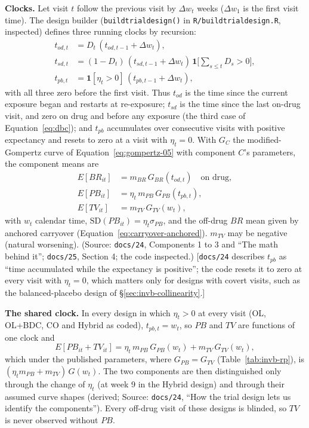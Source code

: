 \documentclass[11pt]{article}
\newcommand{\note}[1]{\textcolor{blue!60!black}{\small [#1]}}
\newcommand{\code}[1]{\texttt{#1}}
\begin{document}
\textbf{Clocks.} Let visit $t$ follow the previous visit by
$\Delta w_t$ weeks ($\Delta w_1$ is the first visit time). The design
builder (\code{buildtrialdesign()} in \code{R/buildtrialdesign.R},
inspected) defines three running clocks by recursion:
\begin{equation}
\begin{aligned}
t_{od,t} &= D_t\,(t_{od,t-1} + \Delta w_t), \\
t_{sd,t} &= (1 - D_t)\,(t_{sd,t-1} + \Delta w_t)\,
  \mathbf 1\Big[\textstyle\sum_{s \le t} D_s > 0\Big], \\
t_{pb,t} &= \mathbf 1[\eta_t > 0]\,(t_{pb,t-1} + \Delta w_t),
\end{aligned}
\label{eq:invb-clocks}
\end{equation}
with all three zero before the first visit. Thus $t_{od}$ is the time
since the current exposure began and restarts at re-exposure; $t_{sd}$
is the time since the last on-drug visit, and zero on drug and before
any exposure (the third case of Equation~\eqref{eq:dbc}); and $t_{pb}$
accumulates over consecutive visits with positive expectancy and
resets to zero at a visit with $\eta_t = 0$. With $G_C$ the
modified-Gompertz curve of Equation~\eqref{eq:gompertz-05} with
component $C$'s parameters, the component means are
\begin{equation}
\begin{aligned}
E[BR_{it}] &= m_{BR}\,G_{BR}(t_{od,t}) \quad \text{on drug}, \\
E[PB_{it}] &= \eta_t\, m_{PB}\, G_{PB}(t_{pb,t}), \\
E[TV_{it}] &= m_{TV}\, G_{TV}(w_t),
\end{aligned}
\label{eq:invb-component-means}
\end{equation}
with $w_t$ calendar time, $\mathrm{SD}(PB_{it}) = \eta_t\sigma_{PB}$,
and the off-drug $BR$ mean given by anchored carryover
(Equation~\eqref{eq:carryover-anchored}). $m_{TV}$ may be negative
(natural worsening). (Source: \code{docs/24}, Components 1 to 3 and
``The math behind it''; \code{docs/25}, Section 4; the code
inspected.) \note{\code{docs/24} describes $t_{pb}$ as ``time
accumulated while the expectancy is positive''; the code resets it to
zero at every visit with $\eta_t = 0$, which matters only for designs
with covert visits, such as the balanced-placebo design of
\S\ref{sec:invb-collinearity}.}

\textbf{The shared clock.} In every design in which $\eta_t > 0$ at
every visit (OL, OL+BDC, CO and Hybrid as coded), $t_{pb,t} = w_t$, so
$PB$ and $TV$ are functions of one clock and
\begin{equation}
E[PB_{it} + TV_{it}] = \eta_t\, m_{PB}\, G_{PB}(w_t) + m_{TV}\,
  G_{TV}(w_t),
\label{eq:invb-shared-clock}
\end{equation}
which under the published parameters, where $G_{PB} = G_{TV}$
(Table~\ref{tab:invb-rp}), is $(\eta_t m_{PB} + m_{TV})\,G(w_t)$.
The two components are then distinguished only through the change of
$\eta_t$ (at week 9 in the Hybrid design) and through their assumed
curve shapes (derived; Source: \code{docs/24}, ``How the trial design
lets us identify the components''). Every off-drug visit of these
designs is blinded, so $TV$ is never observed without $PB$.
\end{document}
